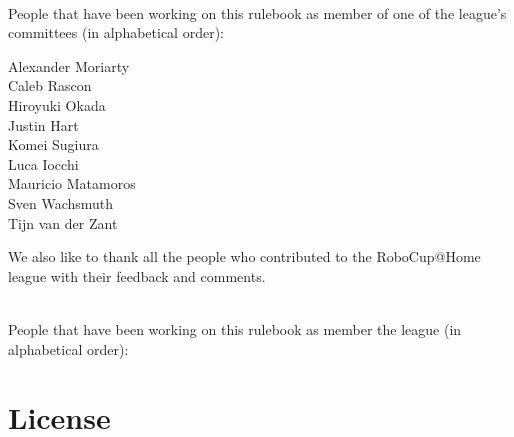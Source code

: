 ~\\\noindent People that have been working on this rulebook as member of one of the league's committees (in alphabetical order):
\begin{center}
\begin{minipage}{0.8\textwidth}
\begin{multicols}{3}%
\footnotesize
\noindent%

Alexander Moriarty\\
Caleb Rascon\\
Hiroyuki Okada\\
\columnbreak
Justin Hart\\
Komei Sugiura\\
Luca Iocchi\\
\columnbreak
Mauricio Matamoros\\
Sven Wachsmuth\\
Tijn van der Zant\\
\end{multicols}
\end{minipage}
\end{center}

We also like to thank all the people who contributed to the RoboCup@Home league with their feedback and comments.

~\\\noindent People that have been working on this rulebook as member the league (in alphabetical order):
\begin{center}
\begin{minipage}{0.8\textwidth}
\end{minipage}
\end{center}

\section*{License}

\doclicenseThis



